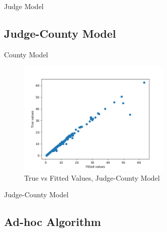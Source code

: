 \documentclass[11pt, oneside]{article}   	%
\theoremstyle{ModifiedStyle}
\begin{document}
		    \begin{table}[H]
		      \centering
		      \caption{Judge Model}
		      
		    \end{table}

		  \subsection{Judge-County Model}

		    \begin{table}[H]
		      \centering
		      \caption{County Model}
		      
		    \end{table}

		    \begin{figure}[H]
		      \centering
		      \includegraphics[width=0.65\textwidth]{../../output/figures/Exploration/fit_min_JudgeIDCounty}
		      \caption{True vs Fitted Values, Judge-County Model}
		    \end{figure}

		    \begin{table}[H]
		      \centering
		      \caption{Judge-County Model}
		      
		    \end{table}

  \subsection{Ad-hoc Algorithm}
\end{document}
